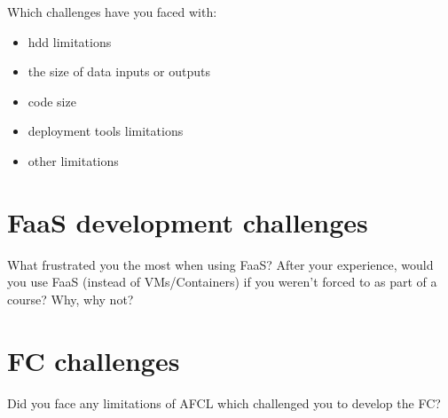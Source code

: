Which challenges have you faced with:

\begin{itemize}
    \item hdd limitations
    \item the size of data inputs or outputs
    \item code size
    \item deployment tools limitations
    \item other limitations
\end{itemize}



%
%
%
\section{FaaS development challenges}

What frustrated you the most when using FaaS?
After your experience, would you use FaaS (instead of VMs/Containers) if you weren't forced to as part of a course? Why, why not?



%
%
%
\section{FC challenges}

Did you face any limitations of AFCL which challenged you to develop the FC?
